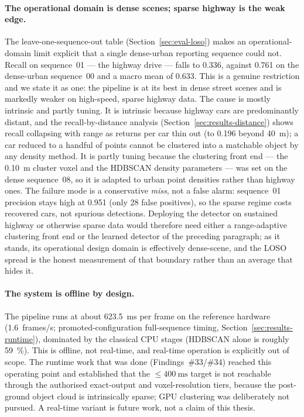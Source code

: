 \paragraph{The operational domain is dense scenes; sparse highway is the weak edge.}
The leave-one-sequence-out table (Section~\ref{sec:eval-loso}) makes an operational-domain
limit explicit that a single dense-urban reporting sequence could not. Recall on
sequence~01 --- the highway drive --- falls to \num{0.336}, against \num{0.761} on the
dense-urban sequence~00 and a macro mean of \num{0.633}. This is a genuine restriction and
we state it as one: the pipeline is at its best in dense street scenes and is markedly
weaker on high-speed, sparse highway data. The cause is mostly intrinsic and partly tuning.
It is intrinsic because highway cars are predominantly distant, and the recall-by-distance
analysis (Section~\ref{sec:results-distance}) shows recall collapsing with range as returns
per car thin out (to \num{0.196} beyond \SI{40}{\metre}); a car reduced to a handful of
points cannot be clustered into a matchable object by any density method. It is partly
tuning because the clustering front end --- the \SI{0.10}{\metre} cluster voxel and the
HDBSCAN density parameters --- was set on the dense sequence~08, so it is adapted to urban
point densities rather than highway ones. The failure mode is a conservative \emph{miss},
not a false alarm: sequence~01 precision stays high at \num{0.951} (only \num{28} false
positives), so the sparse regime costs recovered cars, not spurious detections. Deploying
the detector on sustained highway or otherwise sparse data would therefore need either a
range-adaptive clustering front end or the learned detector of the preceding paragraph; as
it stands, its operational design domain is effectively dense-scene, and the LOSO spread is
the honest measurement of that boundary rather than an average that hides it.

\paragraph{The system is offline by design.}
The pipeline runs at about \SI{623.5}{\milli\second} per frame on the reference hardware
(\num{1.6}~frames/s; promoted-configuration full-sequence timing, Section~\ref{sec:results-runtime}), dominated
by the classical CPU stages (HDBSCAN alone is roughly \SI{59}{\percent}). This is offline,
not real-time, and real-time operation is explicitly out of scope. The runtime work that
was done (Findings~\#33/\#34) reached this operating point and established that the
$\leq\SI{400}{\milli\second}$ target is not reachable through the authorised
exact-output and voxel-resolution tiers, because the post-ground object cloud is
intrinsically sparse; GPU clustering was deliberately not pursued. A real-time variant is
future work, not a claim of this thesis.

